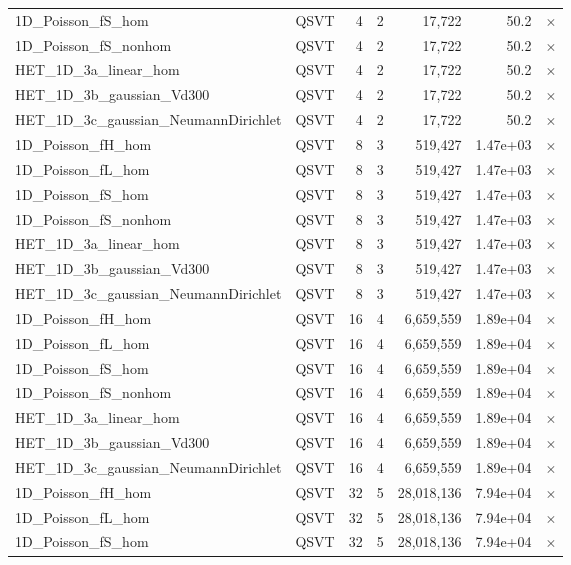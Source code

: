 \begin{table}[htbp]
\begin{tabular}{llrrrrl}
    1D\_Poisson\_fS\_hom & QSVT & 4 & 2 & 17,722 & 50.2 & $\times$ \\
    1D\_Poisson\_fS\_nonhom & QSVT & 4 & 2 & 17,722 & 50.2 & $\times$ \\
    HET\_1D\_3a\_linear\_hom & QSVT & 4 & 2 & 17,722 & 50.2 & $\times$ \\
    HET\_1D\_3b\_gaussian\_Vd300 & QSVT & 4 & 2 & 17,722 & 50.2 & $\times$ \\
    HET\_1D\_3c\_gaussian\_NeumannDirichlet & QSVT & 4 & 2 & 17,722 & 50.2 & $\times$ \\
    1D\_Poisson\_fH\_hom & QSVT & 8 & 3 & 519,427 & 1.47e+03 & $\times$ \\
    1D\_Poisson\_fL\_hom & QSVT & 8 & 3 & 519,427 & 1.47e+03 & $\times$ \\
    1D\_Poisson\_fS\_hom & QSVT & 8 & 3 & 519,427 & 1.47e+03 & $\times$ \\
    1D\_Poisson\_fS\_nonhom & QSVT & 8 & 3 & 519,427 & 1.47e+03 & $\times$ \\
    HET\_1D\_3a\_linear\_hom & QSVT & 8 & 3 & 519,427 & 1.47e+03 & $\times$ \\
    HET\_1D\_3b\_gaussian\_Vd300 & QSVT & 8 & 3 & 519,427 & 1.47e+03 & $\times$ \\
    HET\_1D\_3c\_gaussian\_NeumannDirichlet & QSVT & 8 & 3 & 519,427 & 1.47e+03 & $\times$ \\
    1D\_Poisson\_fH\_hom & QSVT & 16 & 4 & 6,659,559 & 1.89e+04 & $\times$ \\
    1D\_Poisson\_fL\_hom & QSVT & 16 & 4 & 6,659,559 & 1.89e+04 & $\times$ \\
    1D\_Poisson\_fS\_hom & QSVT & 16 & 4 & 6,659,559 & 1.89e+04 & $\times$ \\
    1D\_Poisson\_fS\_nonhom & QSVT & 16 & 4 & 6,659,559 & 1.89e+04 & $\times$ \\
    HET\_1D\_3a\_linear\_hom & QSVT & 16 & 4 & 6,659,559 & 1.89e+04 & $\times$ \\
    HET\_1D\_3b\_gaussian\_Vd300 & QSVT & 16 & 4 & 6,659,559 & 1.89e+04 & $\times$ \\
    HET\_1D\_3c\_gaussian\_NeumannDirichlet & QSVT & 16 & 4 & 6,659,559 & 1.89e+04 & $\times$ \\
    1D\_Poisson\_fH\_hom & QSVT & 32 & 5 & 28,018,136 & 7.94e+04 & $\times$ \\
    1D\_Poisson\_fL\_hom & QSVT & 32 & 5 & 28,018,136 & 7.94e+04 & $\times$ \\
    1D\_Poisson\_fS\_hom & QSVT & 32 & 5 & 28,018,136 & 7.94e+04 & $\times$ \\

\end{tabular}
\end{table}
